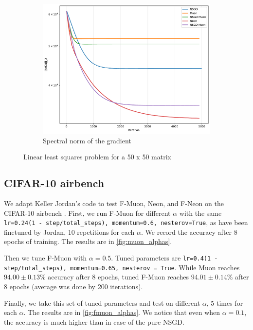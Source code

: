 \documentclass{article} %
\begin{document}
\begin{figure}[h!]
\begin{subfigure}[t]{0.48\linewidth}
            \includegraphics[width=\linewidth]{figs/simple_lls/gradient_spectral_norm_vs_iteration_50x50.pdf}
            \caption{Spectral norm of the gradient}
            \label{fig:lls_grad_norm}
        \end{subfigure}
        \caption{Linear least squares problem for a 50 x 50 matrix}
        \label{fig:lls}
                
    \end{figure}   
    
    
    \subsection{CIFAR-10 airbench}
    We adapt Keller Jordan's code to test F-Muon, Neon, and F-Neon on the CIFAR-10 airbench \citep{cifar2023airbench}.
    First, we run F-Muon for different $\alpha$ with the same {\tt lr=0.24(1 - step/total\_steps), momentum=0.6, nesterov=True}, as have been finetuned by Jordan, 10 repetitions for each $\alpha$. We record the accuracy after 8 epochs of training. The results are in \cref{fig:muon_alphas}.

    Then we tune F-Muon with $\alpha = 0.5$. Tuned parameters are {\tt lr=0.4(1 - step/total\_steps), momentum=0.65, nesterov = True}. While Muon reaches $94.00 \pm 0.13$\% accuracy after 8 epochs, tuned F-Muon reaches $94.01 \pm 0.14\%$ after 8 epochs (average was done by 200 iterations).

    Finally, we take this set of tuned parameters and test on different $\alpha$, 5 times for each $\alpha$. The results are in \cref{fig:fmuon_alphas}. We notice that even when $\alpha=0.1$, the accuracy is much higher than in case of the pure NSGD.
\end{document}
